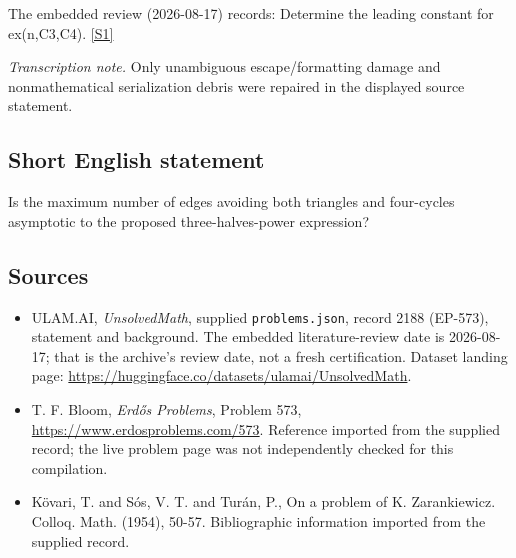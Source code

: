 \documentclass[11pt,a4paper]{article}
\newcommand{\sref}[2]{\hyperlink{source:#1:#2}{[S#2]}}
\begin{document}
The embedded review (2026-08-17) records: Determine the leading constant for ex(n,{C3,C4}). \sref{2188}{1}

{\small\emph{Transcription note.} Only unambiguous escape/formatting damage and nonmathematical serialization debris were repaired in the displayed source statement.}

\subsection{Short English statement}

Is the maximum number of edges avoiding both triangles and four-cycles asymptotic to the proposed three-halves-power expression?

\subsection{Sources}

{\small

\begin{itemize}

\item[\hypertarget{source:2188:1}{S1}] ULAM.AI, \emph{UnsolvedMath}, supplied \texttt{problems.json}, record 2188 (EP-573), statement and background. The embedded literature-review date is 2026-08-17; that is the archive’s review date, not a fresh certification. Dataset landing page: \url{https://huggingface.co/datasets/ulamai/UnsolvedMath}.

\item[\hypertarget{source:2188:2}{S2}] T. F. Bloom, \emph{Erdős Problems}, Problem 573, \url{https://www.erdosproblems.com/573}. Reference imported from the supplied record; the live problem page was not independently checked for this compilation.

\item[\hypertarget{source:2188:3}{S3}] K\"{o}vari, T. and S\'{o}s, V. T. and Tur\'{a}n, P., On a problem of K. Zarankiewicz. Colloq. Math. (1954), 50-57. Bibliographic information imported from the supplied record.

\end{itemize}

}

\label{end:2188}
\end{document}
